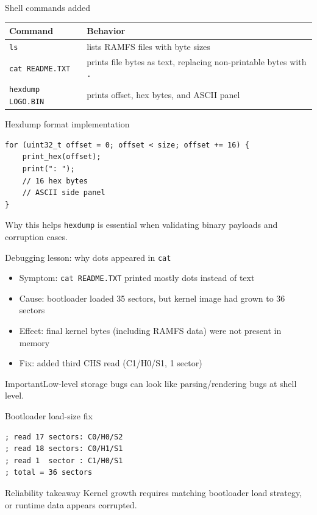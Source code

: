 \documentclass[aspectratio=169]{beamer}
\newcommand{\concept}[2]{%
  \begin{block}{#1}\smallskip #2\smallskip\end{block}\vspace{5pt}}
\newcommand{\warn}[1]{%
  \begin{alertblock}{Important}\smallskip #1\smallskip\end{alertblock}\vspace{5pt}}
\begin{document}
\begin{frame}{Shell commands added}
  \small
  \begin{tabular}{@{}p{3.2cm}p{8.8cm}@{}}
    \toprule
    \textbf{Command} & \textbf{Behavior} \\
    \midrule
    \texttt{ls} & lists RAMFS files with byte sizes \\
    \texttt{cat README.TXT} & prints file bytes as text, replacing non-printable bytes with \texttt{.} \\
    \texttt{hexdump LOGO.BIN} & prints offset, hex bytes, and ASCII panel \\
    \bottomrule
  \end{tabular}
\end{frame}

\begin{frame}[fragile]{Hexdump format implementation}
\begin{lstlisting}[style=clang]
for (uint32_t offset = 0; offset < size; offset += 16) {
    print_hex(offset);
    print(": ");
    // 16 hex bytes
    // ASCII side panel
}
\end{lstlisting}
\concept{Why this helps}{
  \texttt{hexdump} is essential when validating binary payloads and corruption cases.
}
\end{frame}

\begin{frame}{Debugging lesson: why dots appeared in \texttt{cat}}
  \begin{itemize}
    \item Symptom: \texttt{cat README.TXT} printed mostly dots instead of text
    \item Cause: bootloader loaded 35 sectors, but kernel image had grown to 36 sectors
    \item Effect: final kernel bytes (including RAMFS data) were not present in memory
    \item Fix: added third CHS read (C1/H0/S1, 1 sector)
  \end{itemize}
  \warn{Low-level storage bugs can look like parsing/rendering bugs at shell level.}
\end{frame}

\begin{frame}[fragile]{Bootloader load-size fix}
\begin{lstlisting}[style=clang]
; read 17 sectors: C0/H0/S2
; read 18 sectors: C0/H1/S1
; read 1  sector : C1/H0/S1
; total = 36 sectors
\end{lstlisting}
\concept{Reliability takeaway}{
  Kernel growth requires matching bootloader load strategy, or runtime data appears corrupted.
}
\end{frame}
\end{document}
